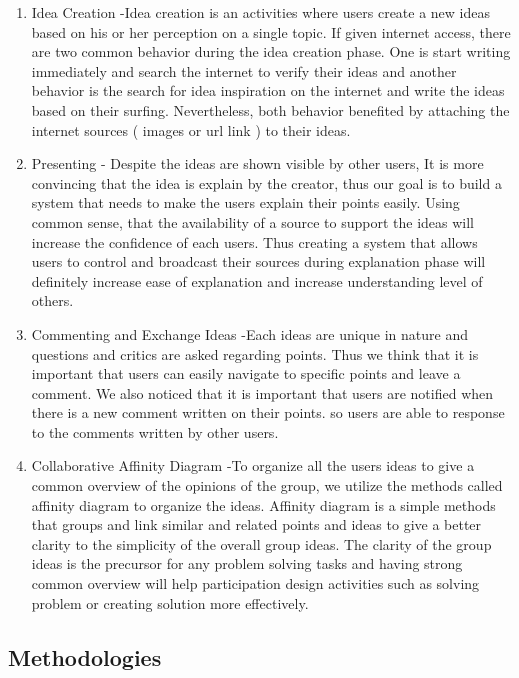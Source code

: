 \documentclass{sigchi}
\begin{document}
\begin{itemize}
\begin{itemize}
\begin{enumerate}
\item Idea Creation -Idea creation is an activities where users create a new ideas based on his or her perception on a single topic. If given internet access, there are two common behavior during the idea creation phase. One is start  writing immediately and search the internet to verify their ideas and another behavior is the search for idea inspiration on the internet and write the ideas based on their surfing. Nevertheless, both behavior benefited by attaching the internet sources ( images or url link ) to their ideas. 
\item Presenting - Despite the ideas are shown visible by other users, It is more convincing that the idea is explain by the creator, thus our goal is to build a system that needs to make the users explain their points easily. Using common sense, that the availability of a source to support the ideas will increase the confidence of each users. Thus creating a system that allows users to control and broadcast their sources during explanation phase will definitely increase ease of explanation and increase understanding level of others. 
\item Commenting and Exchange Ideas -Each ideas are unique in nature and questions and critics are asked regarding points. Thus we think that it is important that users can easily navigate to specific points and leave a comment. We also noticed that it is important that users are notified when there is a new comment written on their points. so users are able to response to the comments written by other users. 
\item Collaborative Affinity Diagram -To organize all the users ideas to give a common overview of the opinions of the group, we utilize the methods called affinity diagram to organize the ideas. Affinity diagram is a simple methods that groups and link similar and related points and ideas to give a better clarity to the simplicity of the overall group ideas. The clarity of the group ideas is the precursor for any problem solving tasks and having strong common overview will help participation design activities such as solving problem or creating solution more effectively. 
\end{enumerate}

\subsection{Methodologies}


\end{itemize}
\end{itemize}
\end{document}
